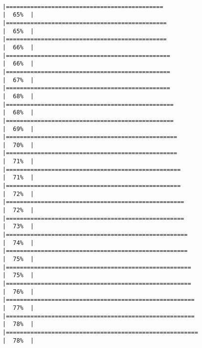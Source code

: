 \documentclass[12pt,twoside]{reedthesis}
\begin{document}
\begin{verbatim}
                                                                        |=============================================                         |  65%  |                                                                              |==============================================                        |  65%  |                                                                              |==============================================                        |  66%  |                                                                              |===============================================                       |  66%  |                                                                              |===============================================                       |  67%  |                                                                              |===============================================                       |  68%  |                                                                              |================================================                      |  68%  |                                                                              |================================================                      |  69%  |                                                                              |=================================================                     |  70%  |                                                                              |=================================================                     |  71%  |                                                                              |==================================================                    |  71%  |                                                                              |==================================================                    |  72%  |                                                                              |===================================================                   |  72%  |                                                                              |===================================================                   |  73%  |                                                                              |====================================================                  |  74%  |                                                                              |====================================================                  |  75%  |                                                                              |=====================================================                 |  75%  |                                                                              |=====================================================                 |  76%  |                                                                              |======================================================                |  77%  |                                                                              |======================================================                |  78%  |                                                                              |=======================================================               |  78%  |       
\end{verbatim}
\end{document}
